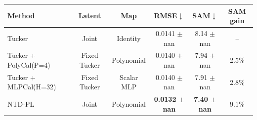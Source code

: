 \begin{tabular}{@{}l c c c c c@{}}
\toprule
Method & Latent & Map & RMSE$\downarrow$ & SAM$\downarrow$ & SAM gain \\
\midrule
Tucker & Joint & Identity & 0.0141 $\pm$ nan & 8.14 $\pm$ nan & -- \\
Tucker + PolyCal(P=4) & Fixed Tucker & Polynomial & 0.0140 $\pm$ nan & 7.94 $\pm$ nan & 2.5\% \\
Tucker + MLPCal(H=32) & Fixed Tucker & Scalar MLP & 0.0140 $\pm$ nan & 7.91 $\pm$ nan & 2.8\% \\
NTD-PL & Joint & Polynomial & \textbf{0.0132 $\pm$ nan} & \textbf{7.40 $\pm$ nan} & 9.1\% \\
\bottomrule
\end{tabular}
